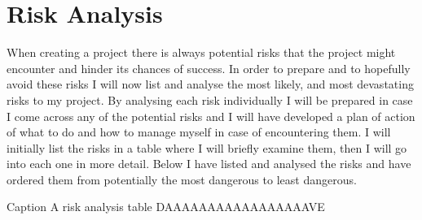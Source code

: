 \documentclass{article}
\begin{document}
\section{Risk Analysis}
When creating a project there is always potential risks that the project might encounter and hinder its chances of success. 
In order to prepare and to hopefully avoid these risks I will now list and analyse the most likely, and most devastating risks to my project. 
By analysing each risk individually I will be prepared in case I come across any of the potential risks and I will have developed a plan of action of what to do and how to manage myself in case of encountering them. 
I will initially list the risks in a table where I will briefly examine them, then I will go into each one in more detail. 
Below I have listed and analysed the risks and have ordered them from potentially the most dangerous to least dangerous. 

Caption A risk analysis table
DAAAAAAAAAAAAAAAAAVE


\end{document}
